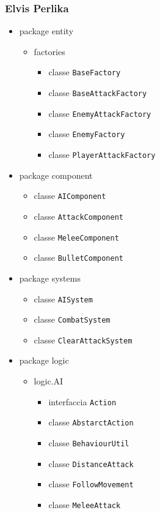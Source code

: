 \documentclass[a4paper,12pt]{report}
\begin{document}
\subsubsection{Elvis Perlika}

\begin{itemize}
	\item package entity
	\begin{itemize}
		\item factories
			\begin{itemize}
			\item classe \texttt{BaseFactory}
			\item classe \texttt{BaseAttackFactory}
			\item classe \texttt{EnemyAttackFactory}
			\item classe \texttt{EnemyFactory}
			\item classe \texttt{PlayerAttackFactory}
			\end{itemize}
	\end{itemize}
	\item package component
		\begin{itemize}
			\item classe \texttt{AIComponent}
			\item classe \texttt{AttackComponent}
			\item classe \texttt{MeleeComponent}
			\item classe \texttt{BulletComponent}
		\end{itemize}
	\item package systems
		\begin{itemize}
			\item classe \texttt{AISystem}
			\item classe \texttt{CombatSystem}
			\item classe \texttt{ClearAttackSystem}
		\end{itemize}
	\item package logic
		\begin{itemize}
			\item logic.AI
				\begin{itemize}
				\item interfaccia \texttt{Action}
				\item classe \texttt{AbstarctAction}
				\item classe \texttt{BehaviourUtil}
				\item classe \texttt{DistanceAttack}
				\item classe \texttt{FollowMovement}
				\item classe \texttt{MeleeAttack}

\end{itemize}
\end{itemize}
\end{itemize}
\end{document}
